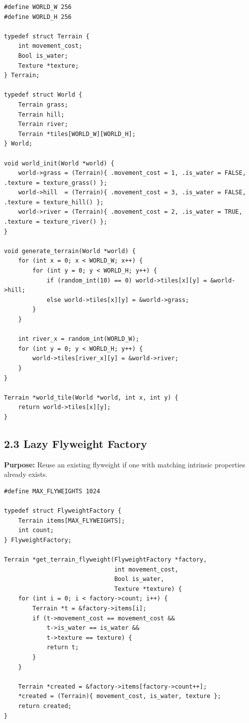 \documentclass[10pt,letterpaper]{article}
\begin{document}
\begin{verbatim}
#define WORLD_W 256
#define WORLD_H 256

typedef struct Terrain {
    int movement_cost;
    Bool is_water;
    Texture *texture;
} Terrain;

typedef struct World {
    Terrain grass;
    Terrain hill;
    Terrain river;
    Terrain *tiles[WORLD_W][WORLD_H];
} World;

void world_init(World *world) {
    world->grass = (Terrain){ .movement_cost = 1, .is_water = FALSE, .texture = texture_grass() };
    world->hill  = (Terrain){ .movement_cost = 3, .is_water = FALSE, .texture = texture_hill() };
    world->river = (Terrain){ .movement_cost = 2, .is_water = TRUE,  .texture = texture_river() };
}

void generate_terrain(World *world) {
    for (int x = 0; x < WORLD_W; x++) {
        for (int y = 0; y < WORLD_H; y++) {
            if (random_int(10) == 0) world->tiles[x][y] = &world->hill;
            else world->tiles[x][y] = &world->grass;
        }
    }

    int river_x = random_int(WORLD_W);
    for (int y = 0; y < WORLD_H; y++) {
        world->tiles[river_x][y] = &world->river;
    }
}

Terrain *world_tile(World *world, int x, int y) {
    return world->tiles[x][y];
}
\end{verbatim}

\subsection{2.3 Lazy Flyweight Factory}

\textbf{Purpose:} Reuse an existing flyweight if one with matching intrinsic properties already exists.

\begin{verbatim}
#define MAX_FLYWEIGHTS 1024

typedef struct FlyweightFactory {
    Terrain items[MAX_FLYWEIGHTS];
    int count;
} FlyweightFactory;

Terrain *get_terrain_flyweight(FlyweightFactory *factory,
                               int movement_cost,
                               Bool is_water,
                               Texture *texture) {
    for (int i = 0; i < factory->count; i++) {
        Terrain *t = &factory->items[i];
        if (t->movement_cost == movement_cost &&
            t->is_water == is_water &&
            t->texture == texture) {
            return t;
        }
    }

    Terrain *created = &factory->items[factory->count++];
    *created = (Terrain){ movement_cost, is_water, texture };
    return created;
}
\end{verbatim}
\end{document}
